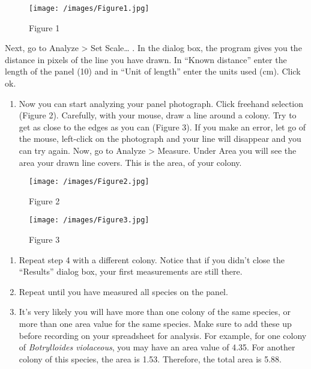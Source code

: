 \documentclass[]{article}
\providecommand{\tightlist}{%
  \setlength{\itemsep}{0pt}\setlength{\parskip}{0pt}}
\begin{document}
\begin{figure}
\centering
\texttt{[image: /images/Figure1.jpg]}
\caption{Figure 1}
\end{figure}

Next, go to Analyze \textgreater{} Set Scale\ldots{} . In the dialog
box, the program gives you the distance in pixels of the line you have
drawn. In ``Known distance'' enter the length of the panel (10) and in
``Unit of length'' enter the units used (cm). Click ok.

\begin{enumerate}
\def\labelenumi{\arabic{enumi}.}
\setcounter{enumi}{3}
\tightlist
\item
  Now you can start analyzing your panel photograph. Click freehand
  selection (Figure 2). Carefully, with your mouse, draw a line around a
  colony. Try to get as close to the edges as you can (Figure 3). If you
  make an error, let go of the mouse, left-click on the photograph and
  your line will disappear and you can try again. Now, go to Analyze
  \textgreater{} Measure. Under Area you will see the area your drawn
  line covers. This is the area, of your colony.
\end{enumerate}

\begin{figure}
\centering
\texttt{[image: /images/Figure2.jpg]}
\caption{Figure 2}
\end{figure}

\begin{figure}
\centering
\texttt{[image: /images/Figure3.jpg]}
\caption{Figure 3}
\end{figure}

\begin{enumerate}
\def\labelenumi{\arabic{enumi}.}
\setcounter{enumi}{4}
\item
  Repeat step 4 with a different colony. Notice that if you didn't close
  the ``Results'' dialog box, your first measurements are still there.
\item
  Repeat until you have measured all species on the panel.
\item
  It's very likely you will have more than one colony of the same
  species, or more than one area value for the same species. Make sure
  to add these up before recording on your spreadsheet for analysis. For
  example, for one colony of \emph{Botrylloides violaceous}, you may
  have an area value of 4.35. For another colony of this species, the
  area is 1.53. Therefore, the total area is 5.88.
\end{enumerate}
\end{document}

